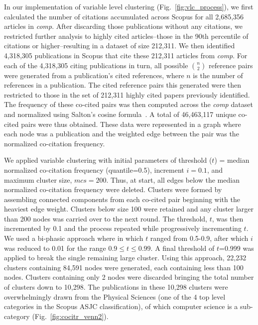 In our implementation of variable level clustering (Fig.~\ref{fig:vlc_process}), we first calculated the number of citations accumulated across Scopus for all 2,685,356 articles in \emph{comp}. After discarding those publications without any citations, we restricted further analysis to highly cited articles--those in the 90th percentile of citations or higher--resulting in a dataset of size 212,311. We then identified 4,318,305 publications in Scopus that cite these 212,311 articles from \emph{comp}. For each of the 4,318,305 citing publications in turn, all possible ${n \choose 2}$ reference pairs were generated from a publication's cited references, where $n$ is the number of references in a publication. The cited reference pairs this generated were then restricted to those in the set of 212,311 highly cited papers previously identified. The frequency of these co-cited pairs was then computed across the \emph{comp} dataset  and normalized using Salton's cosine formula~\cite{salton_citation_1979}. A total of 46,463,117 unique co-cited pairs were thus obtained. These data were represented in a graph where each node was a publication and the weighted edge between the pair was the normalized co-citation frequency. \par 

We applied variable clustering with initial parameters of threshold ($t$) = median normalized co-citation frequency (quantile=0.5), increment $i = 0.1$, and maximum cluster size, $mcs=200$. Thus, at start, all edges below the median normalized co-citation frequency were deleted. Clusters were formed by assembling connected components from each co-cited pair beginning with the heaviest edge weight. Clusters below size 100 were retained and any cluster larger than 200 nodes was carried over to the next round. The threshold, $t$, was then incremented by 0.1 and the process repeated while progressively incrementing $t$.  We used a bi-phasic approach where in which $t$ ranged from 0.5-0.9, after which $i$ was reduced to 0.01 for the range $0.9 \leq t \leq 0.99$. A final threshold of $t$=0.999 was applied to break the single remaining large cluster.  Using this approach, 22,232 clusters containing 84,591 nodes were generated, each containing less than 100 nodes. Clusters containing only 2 nodes were discarded bringing the total number of clusters down to 10,298. The publications in these 10,298 clusters were overwhelmingly drawn from the Physical Sciences (one of the 4 top level categories in the Scopus ASJC classification), of which computer science is a sub-category (Fig.~\ref{fig:cocitr_venn2}).

